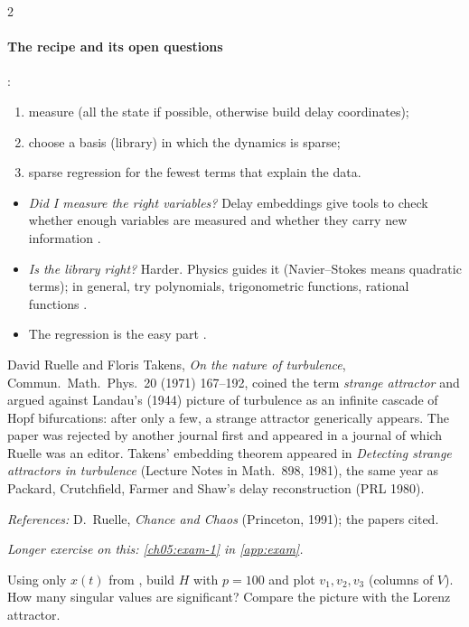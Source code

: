 \begin{paracol}{2}
\paragraph{The recipe and its open questions} :
\begin{enumerate}
  \item measure (all the state if possible, otherwise build delay coordinates);
  \item choose a basis (library) in which the dynamics is sparse;
  \item sparse regression for the fewest terms that explain the data.
\end{enumerate}
\begin{itemize}
  \item \emph{Did I measure the right variables?} Delay embeddings give tools to check whether enough
        variables are measured and whether they carry new information .
  \item \emph{Is the library right?} Harder. Physics guides it (Navier--Stokes means quadratic terms); in
        general, try polynomials, trigonometric functions, rational functions .
  \item The regression is the easy part .
\end{itemize}

\begin{history}
David Ruelle and Floris Takens, \emph{On the nature of turbulence}, Commun.\ Math.\ Phys.\ 20 (1971)
167--192, coined the term \emph{strange attractor} and argued against Landau's (1944) picture of turbulence
as an infinite cascade of Hopf bifurcations: after only a few, a strange attractor generically appears. The
paper was rejected by another journal first and appeared in a journal of which Ruelle was an editor. Takens'
embedding theorem appeared in \emph{Detecting strange attractors in turbulence} (Lecture Notes in Math.\ 898,
1981), the same year as Packard, Crutchfield, Farmer and Shaw's delay reconstruction (PRL 1980).\par
\textit{References:} D.~Ruelle, \emph{Chance and Chaos} (Princeton, 1991); the papers cited.
\end{history}

\noindent\emph{Longer exercise on this: \cref{ch05:exam-1} in \cref{app:exam}.}

\begin{exercise}
Using only $x(t)$ from , build $H$ with $p=100$ and plot $v_1,v_2,v_3$ (columns of
$V$). How many singular values are significant? Compare the picture with the Lorenz attractor.
\end{exercise}


\end{paracol}
